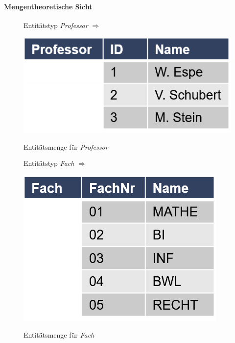 \begin{frame}{\insertsection}
\framesubtitle{Mengentheoretische Sicht}
	\begin{figure}
		Entit\"atstyp \emph{Professor} $\Rightarrow$\quad 
		\begin{minipage}{0.3\linewidth}
			\centering
			\includegraphics[scale=0.5]{img/ERM-BeispielEntitaetsmengeProfessor.png}
		\end{minipage}
	  \quad Entit\"atsmenge f\"ur \emph{Professor}
	\end{figure}    
	\begin{figure}
  	Entit\"atstyp \emph{Fach} $\Rightarrow$\quad 
	  \begin{minipage}{0.3\linewidth}
		 \centering
		 \includegraphics[scale=0.5]{img/ERM-BeispielEntitaetsmengeFach.png}
	  \end{minipage}
	  \quad Entit\"atsmenge f\"ur \emph{Fach}
  \end{figure}    
\end{frame}

